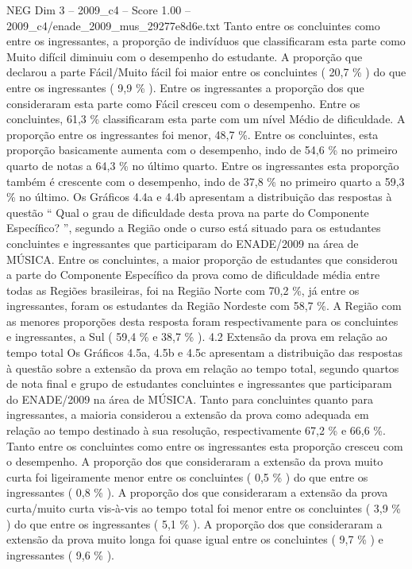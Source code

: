 \begin{textsample}{NEG Dim 3 – 2009\_c4 – Score 1.00 – 2009\_c4/enade\_2009\_mus\_29277e8d6e.txt}
Tanto entre os concluintes como entre os ingressantes, a proporção de indivíduos que classificaram esta parte como Muito difícil diminuiu com o desempenho do estudante.
A proporção que declarou a parte Fácil/Muito fácil foi maior entre os concluintes ( 20,7 \% ) do que entre os ingressantes ( 9,9 \% ).
Entre os ingressantes a proporção dos que consideraram esta parte como Fácil cresceu com o desempenho.
Entre os concluintes, 61,3 \% classificaram esta parte com um nível Médio de dificuldade.
A proporção entre os ingressantes foi menor, 48,7 \%.
Entre os concluintes, esta proporção basicamente aumenta com o desempenho, indo de 54,6 \% no primeiro quarto de notas a 64,3 \% no último quarto.
Entre os ingressantes esta proporção também é crescente com o desempenho, indo de 37,8 \% no primeiro quarto a 59,3 \% no último.
Os Gráficos 4.4a e 4.4b apresentam a distribuição das respostas à questão “ Qual o grau de dificuldade desta prova na parte do Componente Específico? ”, segundo a Região onde o curso está situado para os estudantes concluintes e ingressantes que participaram do ENADE/2009 na área de MÚSICA.
Entre os concluintes, a maior proporção de estudantes que considerou a parte do Componente Específico da prova como de dificuldade média entre todas as Regiões brasileiras, foi na Região Norte com 70,2 \%, já entre os ingressantes, foram os estudantes da Região Nordeste com 58,7 \%.
A Região com as menores proporções desta resposta foram respectivamente para os concluintes e ingressantes, a Sul ( 59,4 \% e 38,7 \% ). 4.2 Extensão da prova em relação ao tempo total Os Gráficos 4.5a, 4.5b e 4.5c apresentam a distribuição das respostas à questão sobre a extensão da prova em relação ao tempo total, segundo quartos de nota final e grupo de estudantes concluintes e ingressantes que participaram do ENADE/2009 na área de MÚSICA.
Tanto para concluintes quanto para ingressantes, a maioria considerou a extensão da prova como adequada em relação ao tempo destinado à sua resolução, respectivamente 67,2 \% e 66,6 \%.
Tanto entre os concluintes como entre os ingressantes esta proporção cresceu com o desempenho.
A proporção dos que consideraram a extensão da prova muito curta foi ligeiramente menor entre os concluintes ( 0,5 \% ) do que entre os ingressantes ( 0,8 \% ).
A proporção dos que consideraram a extensão da prova curta/muito curta vis-à-vis ao tempo total foi menor entre os concluintes ( 3,9 \% ) do que entre os ingressantes ( 5,1 \% ).
A proporção dos que consideraram a extensão da prova muito longa foi quase igual entre os concluintes ( 9,7 \% ) e ingressantes ( 9,6 \% ).

\end{textsample}
